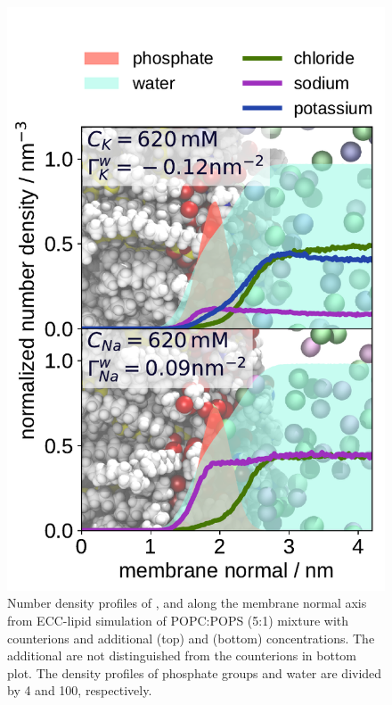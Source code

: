 \documentclass[journal=jctcce,manuscript=article]{achemso}
\newlength{\figwidth}
\begin{document}
\begin{figure}[!h] 
  \centering 
  \includegraphics[width=\figwidth]{../img/ecc_pops/density_profiles_na_k_cl_wat_phos_models-compar_5-6_NaCl-and-KCl-series.pdf}
  \caption{\label{fig:nacl-dens_PCPS} 
    Number density profiles of ,  and  along the membrane normal axis
    from ECC-lipid simulation of POPC:POPS (5:1) mixture with  counterions and
    additional  (top) and  (bottom) concentrations.
    The additional  are not distinguished from the counterions in bottom plot.
    The density profiles of phosphate groups and water are divided by 4 and 100, respectively.  
  }
\end{figure} 
\end{document}
